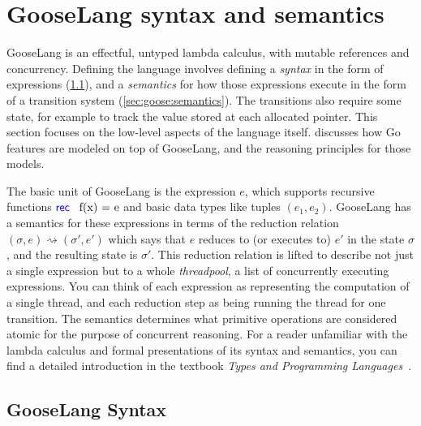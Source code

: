 \section{GooseLang syntax and semantics}%
\label{sec:goose:lang}

\newcommand{\binop}{\circledcirc}
\newcommand{\unop}{\circleddash}

\newcommand{\external}{\mathsf{\textcolor{red}{\langle External \rangle}}}

\newcommand{\recfx}{\mbox{\goosekw{rec} \, f(x) = e}}
\newcommand{\gooselambda}[1]{\goosekw{\lambda}#1.\,}

\newcommand{\reduces}{\rightsquigarrow}
\newcommand{\purereduction}{\overset{\mathrm{pure}}{\reduces}}

GooseLang is an effectful, untyped lambda calculus, with mutable references and
concurrency. Defining the language involves defining a \emph{syntax} in the form
of expressions (\cref{sec:goose:syntax}), and a \emph{semantics} for how those expressions execute in the
form of a transition system (\cref{sec:goose:semantics}). The transitions also require some state, for
example to track the value stored at each allocated pointer. This section
focuses on the low-level aspects of the language itself.
 discusses how Go features are modeled on top of
GooseLang, and the reasoning principles for those models.

The basic unit of GooseLang is the expression $e$, which supports recursive
functions $\recfx$ and basic data types like tuples $(e_1, e_2)$. GooseLang has
a semantics for these expressions in terms of the reduction relation
$(\sigma, e) \reduces (\sigma', e')$ which says that $e$ reduces to (or executes
to) $e'$ in the state $\sigma$, and the resulting state is $\sigma'$. This
reduction relation is lifted to describe not just a single expression but to a
whole \emph{threadpool}, a list of concurrently executing expressions. You
can think of each expression as representing the computation of a single thread,
and each reduction step as being running the thread for one transition. The
semantics determines what primitive operations are considered atomic for the
purpose of concurrent reasoning. For a reader unfamiliar with the lambda
calculus and formal presentations of its syntax and semantics, you can find
a detailed introduction in the textbook \emph{Types and Programming
Languages}~\cite[Chapter~5]{pierce:tapl}.


\subsection{GooseLang Syntax}%
\label{sec:goose:syntax}

